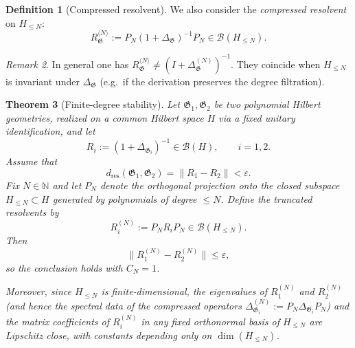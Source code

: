 \documentclass{amsart}
\numberwithin{equation}{section}
\newtheorem{theorem}{Theorem}[section]
\theoremstyle{definition}
\newtheorem{definition}[theorem]{Definition}
\theoremstyle{remark}
\newtheorem{remark}[theorem]{Remark}
\begin{document}
\begin{definition}[Compressed resolvent]\label{def:compressed-resolvent}
We also consider the \emph{compressed resolvent} on $H_{\le N}$:
\[
R_{\mathfrak G}^{\langle N\rangle}:= P_N(1+\Delta_{\mathfrak G})^{-1}P_N \in \mathcal B(H_{\le N}).
\]
\end{definition}

\begin{remark}\label{rem:compressed-vs-truncated}
In general one has $R_{\mathfrak G}^{\langle N\rangle}\neq (I+\Delta_{\mathfrak G}^{(N)})^{-1}$.
They coincide when $H_{\le N}$ is invariant under $\Delta_{\mathfrak G}$ (e.g.\ if the derivation preserves the degree filtration).
\end{remark}




\begin{theorem}[Finite-degree stability]
\label{thm:finite-degree-stability}
Let $\mathfrak G_1,\mathfrak G_2$ be two polynomial Hilbert geometries, realized on a common
Hilbert space $H$ via a fixed unitary identification, and let
\[
R_i:=(1+\Delta_{\mathfrak G_i})^{-1}\in\mathcal B(H),\qquad i=1,2.
\]
Assume that
\[
d_{\mathrm{res}}(\mathfrak G_1,\mathfrak G_2)=\|R_1-R_2\|<\varepsilon.
\]
Fix $N\in\mathbb N$ and let $P_N$ denote the orthogonal projection onto the closed subspace
$H_{\le N}\subset H$ generated by polynomials of degree $\le N$.
Define the truncated resolvents by
\[
R_i^{(N)}:=P_NR_iP_N\in\mathcal B(H_{\le N}).
\]
Then
\begin{equation}\label{eq:finite-degree-resolvent}
\|R_1^{(N)}-R_2^{(N)}\|\le \varepsilon,
\end{equation}
so the conclusion holds with $C_N=1$.

Moreover, since $H_{\le N}$ is finite-dimensional, the eigenvalues of $R_1^{(N)}$ and $R_2^{(N)}$
(and hence the spectral data of the compressed operators $\Delta_{\mathfrak G_i}^{(N)}:=P_N\Delta_{\mathfrak G_i}P_N$)
and the matrix coefficients of $R_i^{(N)}$ in any fixed orthonormal basis of $H_{\le N}$
are Lipschitz close, with constants depending only on $\dim(H_{\le N})$.
\end{theorem}
\end{document}
